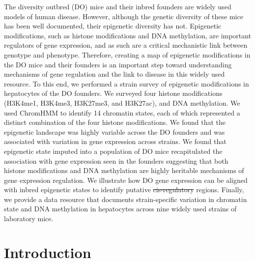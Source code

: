 \documentclass[
  11pt,
]{article}
\providecommand{\DIFaddtex}[1]{{\protect\color{blue}\uwave{#1}}} %
\providecommand{\DIFdeltex}[1]{{\protect\color{red}\sout{#1}}}                      %
\providecommand{\DIFaddbegin}{} %
\providecommand{\DIFaddend}{} %
\providecommand{\DIFdelbegin}{} %
\providecommand{\DIFdelend}{} %
\providecommand{\DIFadd}[1]{\texorpdfstring{\DIFaddtex{#1}}{#1}} %
\providecommand{\DIFdel}[1]{\texorpdfstring{\DIFdeltex{#1}}{}} %
\newcommand{\DIFscaledelfig}{0.5}
\newlength{\DIFdelgraphicswidth} %
\newlength{\DIFdelgraphicsheight} %
\newcommand{\DIFaddincludegraphics}[2][]{{\color{blue}\fbox{\DIFOincludegraphics[#1]{#2}}}} %
\newcommand{\DIFdelincludegraphics}[2][]{%
\sbox{\DIFdelgraphicsbox}{\DIFOincludegraphics[#1]{#2}}%
\settoboxwidth{\DIFdelgraphicswidth}{\DIFdelgraphicsbox} %
\settoboxtotalheight{\DIFdelgraphicsheight}{\DIFdelgraphicsbox} %
\scalebox{\DIFscaledelfig}{%
\parbox[b]{\DIFdelgraphicswidth}{\usebox{\DIFdelgraphicsbox}\\[-\baselineskip] \rule{\DIFdelgraphicswidth}{0em}}\llap{\resizebox{\DIFdelgraphicswidth}{\DIFdelgraphicsheight}{%
\setlength{\unitlength}{\DIFdelgraphicswidth}%
\begin{picture}(1,1)%
\thicklines\linethickness{2pt} %
{\color[rgb]{1,0,0}\put(0,0){\framebox(1,1){}}}%
{\color[rgb]{1,0,0}\put(0,0){\line( 1,1){1}}}%
{\color[rgb]{1,0,0}\put(0,1){\line(1,-1){1}}}%
\end{picture}%
}\hspace*{3pt}}} %
} %
\DeclareRobustCommand{\DIFaddbegin}{\DIFOaddbegin \let\includegraphics\DIFaddincludegraphics} %
\DeclareRobustCommand{\DIFaddend}{\DIFOaddend \let\includegraphics\DIFOincludegraphics} %
\DeclareRobustCommand{\DIFdelbegin}{\DIFOdelbegin \let\includegraphics\DIFdelincludegraphics} %
\DeclareRobustCommand{\DIFdelend}{\DIFOaddend \let\includegraphics\DIFOincludegraphics} %
\begin{document}
The diversity outbred (DO) mice and their inbred founders are widely
used models of human disease. However, although the genetic diversity of
these mice has been well documented, their epigenetic diversity has not.
Epigenetic modifications, such as histone modifications and DNA
methylation, are important regulators of gene expression, and as such
are a critical mechanistic link between genotype and phenotype.
Therefore, creating a map of epigenetic modifications in the DO mice and
their founders is an important step toward understanding mechanisms of
gene regulation and the link to disease in this widely used resource. To
this end, we performed a strain survey of epigenetic modifications in
hepatocytes of the DO founders. We surveyed four histone modifications
(H3K4me1, H3K4me3, H3K27me3, and H3K27ac), and DNA methylation. We used
ChromHMM to identify 14 chromatin states, each of which represented a
distinct combination of the four histone modifications. We found that
the epigenetic landscape was highly variable across the DO founders and
was associated with variation in gene expression across strains. We
found that epigenetic state imputed into a population of DO mice
recapitulated the association with gene expression seen in the founders
suggesting that both histone modifications and DNA methylation are
highly heritable mechanisms of gene expression regulation. We illustrate
how DO gene expression can be aligned with inbred epigenetic states to
identify putative \DIFdelbegin \DIFdel{cis-regulatory }\DIFdelend \DIFaddbegin \textit{\DIFadd{cis}}\DIFadd{-regulatory }\DIFaddend regions. Finally, we provide a
data resource that documents strain-specific variation in chromatin
state and DNA methylation in hepatocytes across nine widely used strains
of laboratory mice.

\hypertarget{introduction}{%
\section{Introduction}\label{introduction}}
\end{document}
